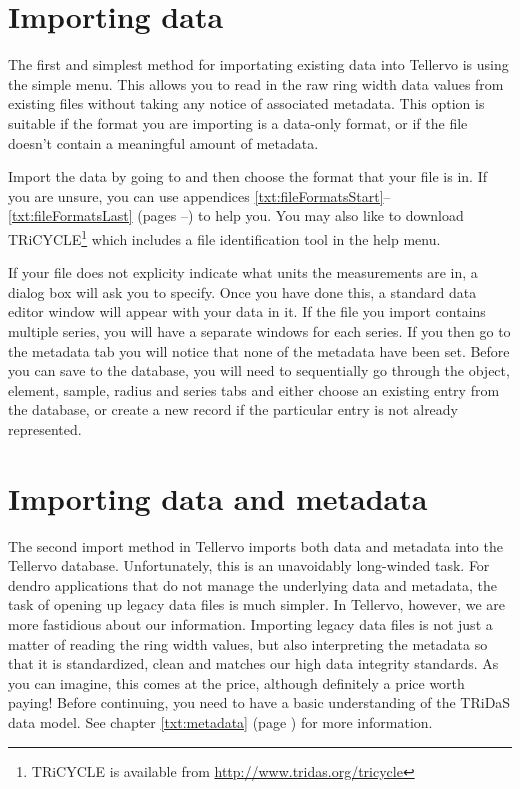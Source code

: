 \section{Importing data}
The first and simplest method for importating existing data into Tellervo is using the simple  menu.  This allows you to read in the raw ring width data values from existing files without taking any notice of associated metadata.  This option is suitable if the format you are importing is a data-only format, or if the file doesn't contain a meaningful amount of metadata.


Import the data by going to  and then choose the format that your file is in.  If you are unsure, you can use appendices \ref{txt:fileFormatsStart}--\ref{txt:fileFormatsLast} (pages \pageref{txt:fileFormatsStart}--\pageref{txt:fileFormatsEnd}) to help you.  You may also like to download TRiCYCLE\footnote{TRiCYCLE is available from \url{http://www.tridas.org/tricycle}} which includes a file identification tool in the help menu.

If your file does not explicity indicate what units the measurements are in, a dialog box will ask you to specify.  Once you have done this, a standard data editor window will appear with your data in it.  If the file you import contains multiple series, you will have a separate windows for each series.  If you then go to the metadata tab you will notice that none of the metadata have been set.  Before you can save to the database, you will need to sequentially go through the object, element, sample, radius and series tabs and either choose an existing entry from the database, or create a new record if the particular entry is not already represented.  


\section{Importing data and metadata}

The second import method in Tellervo imports both data and metadata into the Tellervo database.  Unfortunately, this is an unavoidably long-winded task.  For dendro applications that do not manage the underlying data and metadata, the task of opening up legacy data files is much simpler.  In Tellervo, however, we are more fastidious about our information.  Importing legacy data files is not just a matter of reading the ring width values, but also interpreting the metadata so that it is standardized, clean and matches our high data integrity standards.  As you can imagine, this comes at the price, although definitely a price worth paying!  Before continuing, you need to have a basic understanding of the TRiDaS data model.  See chapter \ref{txt:metadata} (page \pageref{txt:metadata}) for more information.




